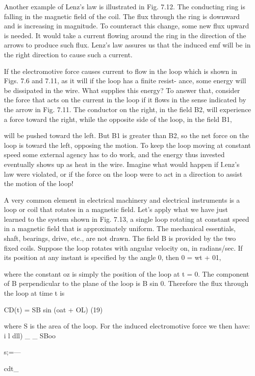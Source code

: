 Another example of Lenz's law is illustrated in Fig. 7.12. The
conducting ring is falling in the magnetic field of the coil. The flux
through the ring is downward and is increasing in magnitude. To
counteract this change, some new flux upward is needed. It would
take a current flowing around the ring in the direction of the arrows
to produce such flux. Lenz's law assures us that the induced emf will
be in the right direction to cause such a current.

If the electromotive force causes current to flow in the loop which
is shown in Figs. 7.6 and 7.11, as it will if the loop has a finite resist-
ance, some energy will be dissipated in the wire. What supplies this
energy? To answer that, consider the force that acts on the current
in the loop if it flows in the sense indicated by the arrow in Fig. 7.11.
The conductor on the right, in the field B2, will experience a force
toward the right, while the opposite side of the loop, in the field B1,

will be pushed toward the left. But B1 is greater than B2, so the net
force on the loop is toward the left, opposing the motion. To keep
the loop moving at constant speed some external agency has to do
work, and the energy thus invested eventually shows up as heat in
the wire. Imagine what would happen if I.enz's law were violated,
or if the force on the loop were to act in a direction to assist the
motion of the loop!

A very common element in electrical machinery and electrical instruments
is a loop or coil that rotates in a magnetic field. Let's apply
what we have just learned to the system shown in Fig. 7.13, a single
loop rotating at constant speed in a magnetic field that is approximately
uniform. The mechanical essentials, shaft, bearings, drive,
etc., are not drawn. The field B is provided by the two fixed coils.
Suppose the loop rotates with angular velocity on, in radians/sec. If
its position at any instant is specified by the angle 0, then 0 = wt + 01,

where the constant oz is simply the position of the loop at t = 0. The
component of B perpendicular to the plane of the loop is B sin 0.
Therefore the flux through the loop at time t is

CD(t) = SB sin (oat + OL) (19)

where S is the area of the loop. For the induced electromotive force
we then have: i
l dll) _ _ SBoo

s;=---

cdt_

